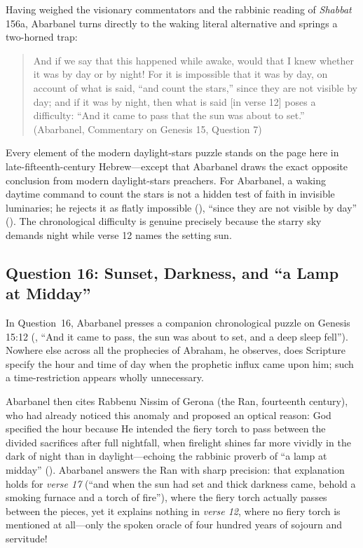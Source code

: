 Having weighed the visionary commentators and the rabbinic reading of \emph{Shabbat} 156a, Abarbanel turns directly to the waking literal alternative and springs a two-horned trap:

\begin{quote}
And if we say that this happened while awake, would that I knew whether it was by day or by night! For it is impossible that it was by day, on account of what is said, ``and count the stars,'' since they are not visible by day; and if it was by night, then what is said [in verse 12] poses a difficulty: ``And it came to pass that the sun was about to set.'' (Abarbanel, Commentary on Genesis 15, Question 7)
\end{quote}

Every element of the modern daylight-stars puzzle stands on the page here in late-fifteenth-century Hebrew---except that Abarbanel draws the exact opposite conclusion from modern daylight-stars preachers. For Abarbanel, a waking daytime command to count the stars is not a hidden test of faith in invisible luminaries; he rejects it as flatly impossible (), ``since they are not visible by day'' (). The chronological difficulty is genuine precisely because the starry sky demands night while verse 12 names the setting sun.

\subsection{Question 16: Sunset, Darkness, and ``a Lamp at Midday''}

In Question~16, Abarbanel presses a companion chronological puzzle on Genesis 15:12 (, ``And it came to pass, the sun was about to set, and a deep sleep fell''). Nowhere else across all the prophecies of Abraham, he observes, does Scripture specify the hour and time of day when the prophetic influx came upon him; such a time-restriction appears wholly unnecessary.

Abarbanel then cites Rabbenu Nissim of Gerona (the Ran, fourteenth century), who had already noticed this anomaly and proposed an optical reason: God specified the hour because He intended the fiery torch to pass between the divided sacrifices after full nightfall, when firelight shines far more vividly in the dark of night than in daylight---echoing the rabbinic proverb of ``a lamp at midday'' (). Abarbanel answers the Ran with sharp precision: that explanation holds for \emph{verse 17} (``and when the sun had set and thick darkness came, behold a smoking furnace and a torch of fire''), where the fiery torch actually passes between the pieces, yet it explains nothing in \emph{verse 12}, where no fiery torch is mentioned at all---only the spoken oracle of four hundred years of sojourn and servitude!

